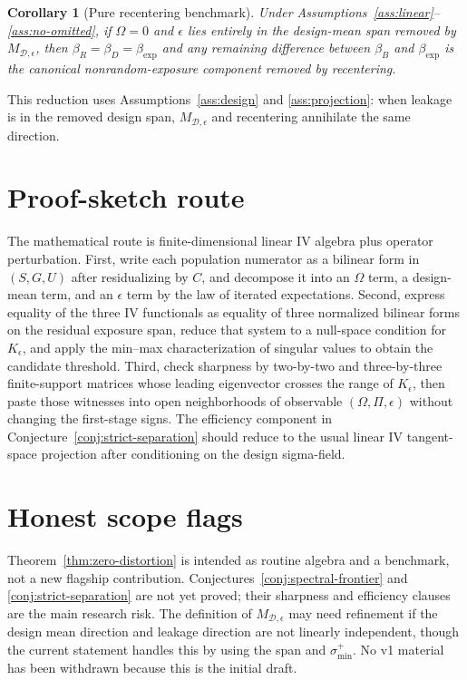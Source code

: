 \documentclass[11pt]{article}
\theoremstyle{definition}
\theoremstyle{plain}
\newtheorem{corollary}{Corollary}
\theoremstyle{remark}
\begin{document}
\begin{corollary}[Pure recentering benchmark]\label{cor:recenter}
Under Assumptions~\ref{ass:linear}--\ref{ass:no-omitted}, if $\Omega=0$ and $\epsilon$ lies entirely in the design-mean span removed by $M_{\mathcal{D},\epsilon}$, then $\beta_R=\beta_D=\beta_{\exp}$ and any remaining difference between $\beta_B$ and $\beta_{\exp}$ is the canonical nonrandom-exposure component removed by recentering.
\end{corollary}
This reduction uses Assumptions~\ref{ass:design} and \ref{ass:projection}: when leakage is in the removed design span, $M_{\mathcal{D},\epsilon}$ and recentering annihilate the same direction.

\section{Proof-sketch route}
The mathematical route is finite-dimensional linear IV algebra plus operator perturbation.  First, write each population numerator as a bilinear form in $(S,G,U)$ after residualizing by $C$, and decompose it into an $\Omega$ term, a design-mean term, and an $\epsilon$ term by the law of iterated expectations.  Second, express equality of the three IV functionals as equality of three normalized bilinear forms on the residual exposure span, reduce that system to a null-space condition for $K_\epsilon$, and apply the min--max characterization of singular values to obtain the candidate threshold.  Third, check sharpness by two-by-two and three-by-three finite-support matrices whose leading eigenvector crosses the range of $K_\epsilon$, then paste those witnesses into open neighborhoods of observable $(\Omega,\Pi,\epsilon)$ without changing the first-stage signs.  The efficiency component in Conjecture~\ref{conj:strict-separation} should reduce to the usual linear IV tangent-space projection after conditioning on the design sigma-field.

\section{Honest scope flags}
Theorem~\ref{thm:zero-distortion} is intended as routine algebra and a benchmark, not a new flagship contribution.  Conjectures~\ref{conj:spectral-frontier} and \ref{conj:strict-separation} are not yet proved; their sharpness and efficiency clauses are the main research risk.  The definition of $M_{\mathcal{D},\epsilon}$ may need refinement if the design mean direction and leakage direction are not linearly independent, though the current statement handles this by using the span and $\sigma_{\min}^{+}$.  No v1 material has been withdrawn because this is the initial draft.
\end{document}
